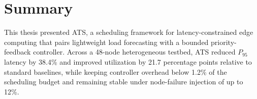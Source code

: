 \section{Summary}

This thesis presented ATS, a scheduling framework for latency-constrained
edge computing that pairs lightweight load forecasting with a bounded
priority-feedback controller. Across a 48-node heterogeneous testbed, ATS
reduced $P_{95}$ latency by 38.4\% and improved utilization by 21.7
percentage points relative to standard baselines, while keeping controller
overhead below 1.2\% of the scheduling budget and remaining stable under
node-failure injection of up to 12\%.
